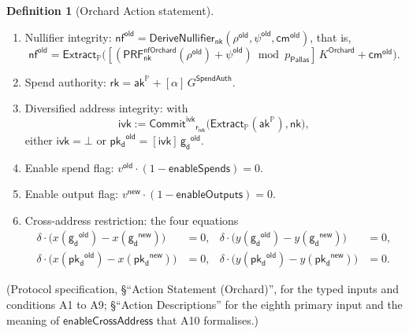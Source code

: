 \documentclass[11pt,a4paper]{article}
\theoremstyle{definition}
\newtheorem{definition}[theorem]{Definition}
\newcommand{\PP}{\mathbb{P}}
\newcommand{\nfsym}{\mathsf{nf}}
\newcommand{\cmsym}{\mathsf{cm}}
\newcommand{\rk}{\mathsf{rk}}
\newcommand{\Pallas}{\ensuremath{\mathsf{Pallas}}}
\newcommand{\CommitIvk}{\ensuremath{\mathsf{Commit}^{\mathsf{ivk}}}}
\newcommand{\Extract}{\ensuremath{\mathsf{Extract}}}
\newcommand{\aksym}{\ensuremath{\mathsf{ak}}}
\newcommand{\nksym}{\ensuremath{\mathsf{nk}}}
\newcommand{\ivk}{\ensuremath{\mathsf{ivk}}}
\newcommand{\pkd}{\ensuremath{\mathsf{pk_d}}}
\newcommand{\gd}{\ensuremath{\mathsf{g_d}}}
\newcommand{\rcv}{\ensuremath{\mathsf{rcv}}}
\newcommand{\rivk}{\ensuremath{\mathsf{r_{ivk}}}}
\begin{document}
\begin{definition}[Orchard Action statement]
\begin{enumerate}[label=A\arabic*., leftmargin=2.6em]
\[    v^{\mathsf{new}}]\,V^{\mathsf{Orchard}} + [\rcv]\,R^{\mathsf{Orchard}}.
  \]
\item Nullifier integrity:
  $\nfsym^{\mathsf{old}} = \mathsf{DeriveNullifier}_{\nksym}(
  \rho^{\mathsf{old}}, \psi^{\mathsf{old}}, \cmsym^{\mathsf{old}})$, that is,
  \[
    \nfsym^{\mathsf{old}} = \Extract_{\PP}\bigl([(
      \mathsf{PRF}^{\mathsf{nfOrchard}}_{\nksym}(\rho^{\mathsf{old}})
      + \psi^{\mathsf{old}}) \bmod p_{\Pallas}]\,K^{\mathsf{Orchard}}
      + \cmsym^{\mathsf{old}}\bigr).
  \]
\item Spend authority:
  $\rk = \aksym^{\PP} + [\alpha]\,G^{\mathsf{SpendAuth}}$.
\item Diversified address integrity: with
  \[
    \ivk := \CommitIvk_{\rivk}\bigl(\Extract_{\PP}(\aksym^{\PP}),
    \nksym\bigr),
  \]
  either $\ivk = \bot$ or
  $\pkd^{\mathsf{old}} = [\ivk]\,\gd^{\mathsf{old}}$.
\item Enable spend flag:
  $v^{\mathsf{old}} \cdot (1 - \mathsf{enableSpends}) = 0$.
\item Enable output flag:
  $v^{\mathsf{new}} \cdot (1 - \mathsf{enableOutputs}) = 0$.
\item Cross-address restriction: the four equations
  \begin{align*}
    \delta \cdot \bigl(x(\gd^{\mathsf{old}}) - x(\gd^{\mathsf{new}})\bigr)
      &= 0, &
    \delta \cdot \bigl(y(\gd^{\mathsf{old}}) - y(\gd^{\mathsf{new}})\bigr)
      &= 0, \\
    \delta \cdot \bigl(x(\pkd^{\mathsf{old}}) - x(\pkd^{\mathsf{new}})\bigr)
      &= 0, &
    \delta \cdot \bigl(y(\pkd^{\mathsf{old}}) - y(\pkd^{\mathsf{new}})\bigr)
      &= 0.
  \end{align*}
\end{enumerate}
(Protocol specification, \S``Action Statement (Orchard)'', for the typed
inputs and conditions A1 to A9; \S``Action Descriptions'' for the eighth
primary input and the meaning of $\mathsf{enableCrossAddress}$ that A10
formalises.)
\end{definition}
\end{document}
